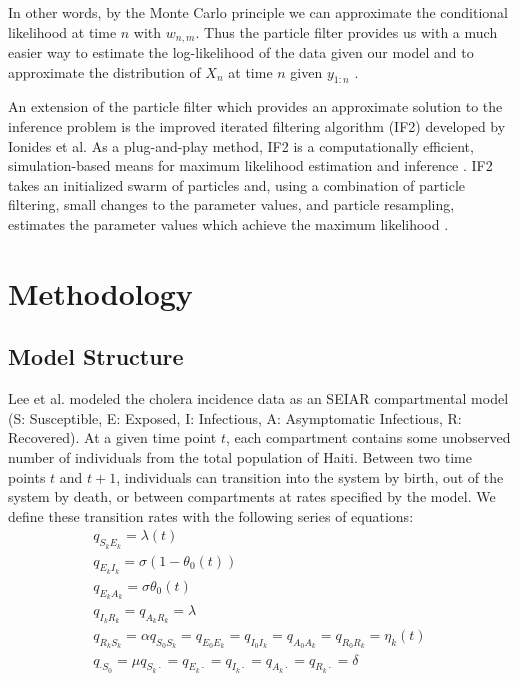 \documentclass[12pt]{article}
\begin{document}
    In other words, by the Monte Carlo principle we can approximate the conditional likelihood at time $n$ with $w_{n,m}$. Thus the particle filter provides us with a much easier way to estimate the log-likelihood of the data given our model and to approximate the distribution of $X_{n}$ at time $n$ given $y_{1:n}$ \cite{King_statinfpomp, Ionides_infpomp, Ionides_if}.
  
  An extension of the particle filter which provides an approximate solution to the inference problem is the improved iterated filtering algorithm (IF2) developed by Ionides et al. As a plug-and-play method, IF2 is a computationally efficient, simulation-based means for maximum likelihood estimation and inference \cite{Ionides_infdynsys}. IF2 takes an initialized swarm of particles and, using a combination of particle filtering, small changes to the parameter values, and particle resampling, estimates the parameter values which achieve the maximum likelihood \cite{Ionides_infpomp}.
  
\section{Methodology}
\subsection{Model Structure}

  Lee et al. modeled the cholera incidence data as an SEIAR compartmental model (S: Susceptible, E: Exposed, I: Infectious, A: Asymptomatic Infectious, R: Recovered). At a given time point $t$, each compartment contains some unobserved number of individuals from the total population of Haiti. Between two time points $t$ and $t+1$, individuals can transition into the system by birth, out of the system by death, or between compartments at rates specified by the model. We define these transition rates with the following series of equations:
        \begin{eqnarray}
        \label{SE}
        q_{S_kE_k} = \lambda(t)
        \\
        \label{EI}
        q_{E_kI_k} = \sigma(1 - \theta_0(t))
        \\
        \label{EA}
        q_{E_kA_k} = \sigma\theta_0(t)
        \\
        \label{IR AR}
        q_{I_kR_k} = q_{A_kR_k} = \lambda
        \\
        \label{RS}
        q_{R_kS_k} = \alpha
        \label{vacc}
        q_{S_0S_k} = q_{E_0E_k} = q_{I_0I_k} = q_{A_0A_k} = q_{R_0R_k} = \eta_k(t)
        \\
        \label{birth}
        q_{\cdot S_0} = \mu
        \label{death}
        q_{S_k \cdot} = q_{E_k \cdot} = q_{I_k \cdot} = q_{A_k \cdot} = q_{R_k \cdot} = \delta
        \end{eqnarray}
        
\end{document}
